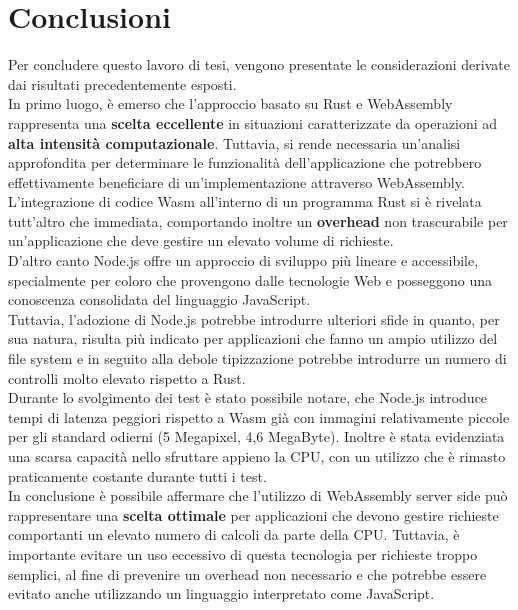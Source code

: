 \section{Conclusioni}
Per concludere questo lavoro di tesi, vengono presentate le considerazioni derivate dai risultati precedentemente esposti.
\\In primo luogo, è emerso che l'approccio basato su Rust e WebAssembly rappresenta una \textbf{scelta eccellente} in situazioni caratterizzate da operazioni ad \textbf{alta intensità computazionale}. Tuttavia, si rende necessaria un'analisi approfondita per determinare le funzionalità dell'applicazione che potrebbero effettivamente beneficiare di un'implementazione attraverso WebAssembly.
\\L'integrazione di codice Wasm all'interno di un programma Rust si è rivelata tutt'altro che immediata, comportando inoltre un \textbf{overhead} non trascurabile per un'applicazione che deve gestire un elevato volume di richieste.
\\D'altro canto Node.js offre un approccio di sviluppo più lineare e accessibile, specialmente per coloro che provengono dalle tecnologie Web e posseggono una conoscenza consolidata del linguaggio JavaScript.
\\Tuttavia, l'adozione di Node.js potrebbe introdurre ulteriori sfide in quanto, per sua natura, risulta più indicato per applicazioni che fanno un ampio utilizzo del file system e in seguito alla debole tipizzazione potrebbe introdurre un numero di controlli molto elevato rispetto a Rust.
\\Durante lo svolgimento dei test è stato possibile notare, che Node.js introduce tempi di latenza peggiori rispetto a Wasm già con immagini relativamente piccole per gli standard odierni (5 Megapixel, 4,6 MegaByte). Inoltre è stata evidenziata una scarsa capacità nello sfruttare appieno la CPU, con un utilizzo che è rimasto praticamente costante durante tutti i test.
\\In conclusione è possibile affermare che l'utilizzo di WebAssembly server side può rappresentare una \textbf{scelta ottimale} per applicazioni che devono gestire richieste comportanti un elevato numero di calcoli da parte della CPU.
Tuttavia, è importante evitare un uso eccessivo di questa tecnologia per richieste troppo semplici, al fine di prevenire un overhead non necessario e che potrebbe essere evitato anche utilizzando un linguaggio interpretato come JavaScript. 